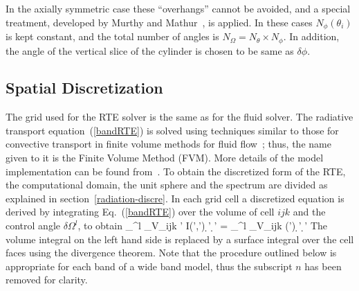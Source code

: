 In the axially symmetric case these ``overhangs'' cannot be avoided, and a
special treatment, developed by Murthy and Mathur~\cite{Murthy}, is
applied. In these cases $N_{\phi}(\theta_i)$ is kept constant, and
the total number of angles is $N_{\Omega} = N_{\theta} \times
N_{\phi}$. In addition, the angle of the vertical slice of the cylinder is
chosen to be same as $\delta\phi$.



\subsection{Spatial Discretization}

The grid used for the RTE solver is the same as for the fluid solver.
The radiative transport equation~(\ref{bandRTE}) is solved using
techniques similar to those for convective transport in finite volume
methods for fluid flow~\cite{Raithby}; thus, the name given to it is
the Finite Volume Method (FVM). More details of the model
implementation can be found from~\cite{Hostikka:2008}.
To obtain the discretized form of the
RTE, the computational domain, the unit sphere and the spectrum are divided as explained in section~\ref{radiation-discre}.
In each grid cell a discretized equation is derived by integrating
Eq.~(\ref{bandRTE}) over the volume of cell $ijk$ and the control
angle $\delta \Omega^l$, to obtain
\be
  \int_{\delta \Omega^l} \int_{V_{ijk}}
   \bs' \cdot \nabla I(\bx',\bs') \d\bx' \d\bs' =
   \int_{\delta \Omega^l} \int_{V_{ijk}} \kappa(\bx') \;
    \left[ I_{\rm b}(\bx') - I(\bx',\bs') \right] \d \bx' \d \bs'
\ee
The volume integral on the left hand side is replaced by a surface
integral over the cell faces using the divergence theorem. Note that
the procedure outlined below is appropriate for each band of a wide
band model, thus the subscript $n$ has been removed for clarity.

